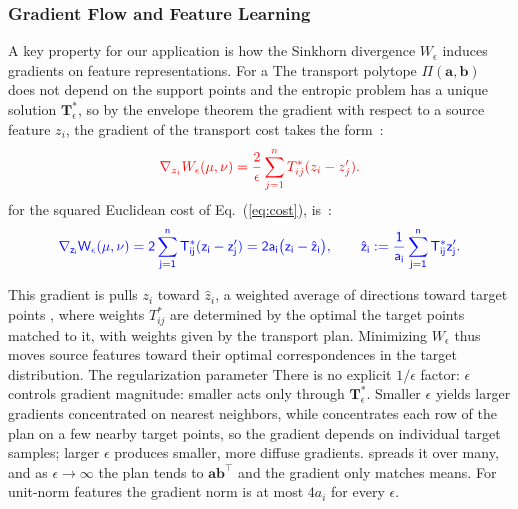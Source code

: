 \documentclass[preprint,12pt]{elsarticle}
\providecommand{\DIFadd}[1]{{\protect\color{blue} \sf #1}} %
\providecommand{\DIFdel}[1]{{\protect\color{red} \scriptsize #1}} %
\providecommand{\DIFaddbegin}{} %
\providecommand{\DIFaddend}{} %
\providecommand{\DIFdelbegin}{} %
\providecommand{\DIFdelend}{} %
\newcommand{\DIFscaledelfig}{0.5}
\newlength{\DIFdelgraphicswidth} %
\newlength{\DIFdelgraphicsheight} %
\newcommand{\DIFaddincludegraphics}[2][]{{\color{blue}\fbox{\DIFOincludegraphics[#1]{#2}}}} %
\newcommand{\DIFdelincludegraphics}[2][]{%
\sbox{\DIFdelgraphicsbox}{\DIFOincludegraphics[#1]{#2}}%
\settoboxwidth{\DIFdelgraphicswidth}{\DIFdelgraphicsbox} %
\settoboxtotalheight{\DIFdelgraphicsheight}{\DIFdelgraphicsbox} %
\scalebox{\DIFscaledelfig}{%
\parbox[b]{\DIFdelgraphicswidth}{\usebox{\DIFdelgraphicsbox}\\[-\baselineskip] \rule{\DIFdelgraphicswidth}{0em}}\llap{\resizebox{\DIFdelgraphicswidth}{\DIFdelgraphicsheight}{%
\setlength{\unitlength}{\DIFdelgraphicswidth}%
\begin{picture}(1,1)%
\thicklines\linethickness{2pt} %
{\color[rgb]{1,0,0}\put(0,0){\framebox(1,1){}}}%
{\color[rgb]{1,0,0}\put(0,0){\line( 1,1){1}}}%
{\color[rgb]{1,0,0}\put(0,1){\line(1,-1){1}}}%
\end{picture}%
}\hspace*{3pt}}} %
} %
\DeclareRobustCommand{\DIFaddbegin}{\DIFOaddbegin \let\includegraphics\DIFaddincludegraphics} %
\DeclareRobustCommand{\DIFaddend}{\DIFOaddend \let\includegraphics\DIFOincludegraphics} %
\DeclareRobustCommand{\DIFdelbegin}{\DIFOdelbegin \let\includegraphics\DIFdelincludegraphics} %
\DeclareRobustCommand{\DIFdelend}{\DIFOaddend \let\includegraphics\DIFOincludegraphics} %
\begin{document}
\subsubsection{Gradient Flow and Feature Learning}

A key property for our application is how \DIFdelbegin \DIFdel{the Sinkhorn divergence }\DIFdelend \DIFaddbegin \DIFadd{$W_\epsilon$ }\DIFaddend induces gradients on feature representations. \DIFdelbegin \DIFdel{For a }\DIFdelend \DIFaddbegin \DIFadd{The transport polytope $\Pi(\mathbf a,\mathbf b)$ does not depend on the support points and the entropic problem has a unique solution $\mathbf T^*_\epsilon$, so by the envelope theorem the gradient with respect to a }\DIFaddend source feature $z_i$, \DIFdelbegin \DIFdel{the gradient of the transport cost takes the form~\citep{peyre2019computational}:
}\begin{displaymath}
    \DIFdel{\label{eq:wasserstein_gradient}
    \nabla_{z_i} W_\epsilon(\mu, \nu) = \frac{2}{\epsilon} \sum_{j=1}^{n} T^*_{ij} (z_i - z'_j).
}\end{displaymath}%
\DIFdelend \DIFaddbegin \DIFadd{for the squared Euclidean cost of Eq.~(\ref{eq:cost}), is~\citep{peyre2019computational}:
}\begin{equation}
    \DIFadd{\label{eq:wasserstein_gradient}
    \nabla_{z_i} W_\epsilon(\mu, \nu) = 2 \sum_{j=1}^{n} T^*_{ij} (z_i - z'_j) = 2a_i\big(z_i-\hat z_i\big),\qquad \hat z_i:=\frac{1}{a_i}\sum_{j=1}^n T^*_{ij}z'_j .
}\end{equation}\DIFaddend 

This gradient \DIFdelbegin \DIFdel{is }\DIFdelend \DIFaddbegin \DIFadd{pulls $z_i$ toward $\hat z_i$, }\DIFaddend a weighted average of \DIFdelbegin \DIFdel{directions toward target points , where weights $T^*_{ij}$ are determined by the optimal }\DIFdelend \DIFaddbegin \DIFadd{the target points matched to it, with weights given by the }\DIFaddend transport plan. Minimizing $W_\epsilon$ thus moves source features toward their optimal correspondences in the target distribution. \DIFdelbegin \DIFdel{The regularization parameter }\DIFdelend \DIFaddbegin \DIFadd{There is no explicit $1/\epsilon$ factor: }\DIFaddend $\epsilon$ \DIFdelbegin \DIFdel{controls gradient magnitude: smaller }\DIFdelend \DIFaddbegin \DIFadd{acts only through $\mathbf T^*_\epsilon$. Smaller }\DIFaddend $\epsilon$ \DIFdelbegin \DIFdel{yields larger gradients concentrated on nearest neighbors, while }\DIFdelend \DIFaddbegin \DIFadd{concentrates each row of the plan on a few nearby target points, so the gradient depends on individual target samples; }\DIFaddend larger $\epsilon$ \DIFdelbegin \DIFdel{produces smaller, more diffuse gradients. }\DIFdelend \DIFaddbegin \DIFadd{spreads it over many, and as $\epsilon\to\infty$ the plan tends to $\mathbf a\mathbf b^\top$ and the gradient only matches means. For unit-norm features the gradient norm is at most $4a_i$ for every $\epsilon$.
}\DIFaddend 
\end{document}
